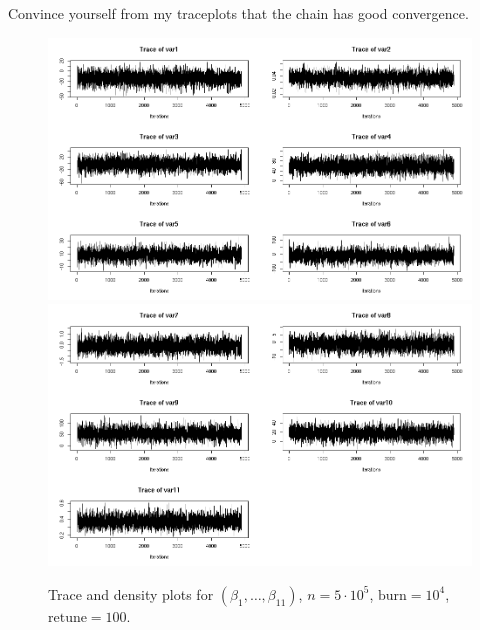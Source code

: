 \documentclass[12pt]{article}
\begin{document}
Convince yourself from my traceplots that the chain has good convergence. 
\begin{figure}[H] \center
\includegraphics[scale=.45]{MCMC_p3_1.jpeg}
\includegraphics[scale=.45]{MCMC_p3_2.jpeg}
\caption*{Trace and density plots for $(\beta_1, \dots, \beta_{11})$, $n=5\cdot 10^5$, $\text{burn}=10^4$, $\text{retune}=100$.}
\end{figure}
\end{document}
